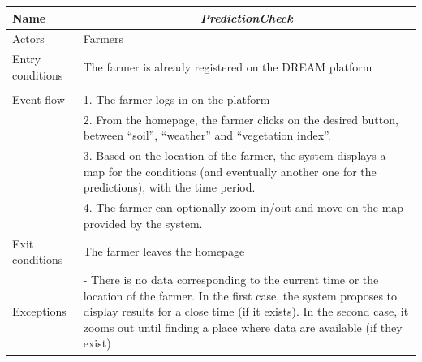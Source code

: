 \begin{table}[htbp]
	\centering
	\begin{tabularx}{\linewidth}{|l|X|}
		\hline
		Name & \multicolumn{1}{c|}{\textit{\textbf{PredictionCheck}}}                                                   \tabularnewline \hline
		Actors                                               & Farmers                                                    \tabularnewline \hline
		Entry conditions                                              &
		The farmer is already registered on the DREAM platform
		\tabularnewline
		&
		\tabularnewline \hline
		Event flow                                         & 1.	The farmer logs in on the platform                                         \tabularnewline 
		& 2.	From the homepage, the farmer clicks on the desired button, between “soil”, “weather” and “vegetation index”.                                          \tabularnewline 
		& 3.	Based on the location of the farmer, the system displays a map for the conditions (and eventually another one for the predictions), with the time period.                                           \tabularnewline 
		& 4.	The farmer can optionally zoom in/out and move on the map provided by the system.                                    \tabularnewline \hline
		Exit conditions 
		& The farmer leaves the homepage
		\tabularnewline \hline
		Exceptions 
		& -	There is no data corresponding to the current time or the location of the farmer. In the first case, the system proposes to display results for a close time (if it exists). In the second case, it zooms out until finding a place where data are available (if they exist)
		\tabularnewline
		\hline
	\end{tabularx}   
\end{table}

